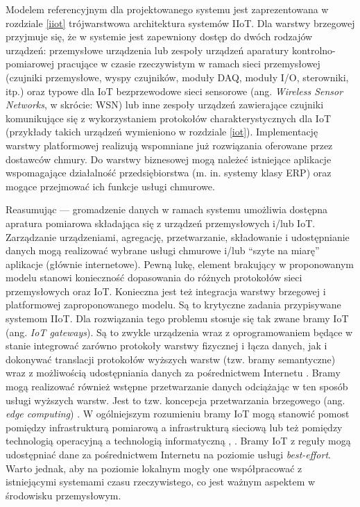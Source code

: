 \documentclass[a4paper, 12pt, twoside]{article}
\begin{document}
Modelem referencyjnym dla projektowanego systemu jest zaprezentowana w rozdziale
\ref{iiot} trójwarstwowa architektura systemów IIoT. Dla warstwy brzegowej przyjmuje 
się, że w systemie jest zapewniony dostęp do dwóch rodzajów urządzeń: przemysłowe urządzenia
lub zespoły urządzeń aparatury kontrolno-pomiarowej pracujące w czasie rzeczywistym 
w ramach sieci przemysłowej
(czujniki przemysłowe, wyspy czujników, moduły DAQ, moduły I/O, sterowniki, itp.)
oraz typowe dla IoT bezprzewodowe sieci sensorowe (ang. \emph{Wireless Sensor Networks}, w skrócie: WSN)
lub inne zespoły urządzeń zawierające czujniki komunikujące się z wykorzystaniem protokołów charakterystycznych dla IoT
\cite{iiot-gateway-introduction}
(przykłady takich urządzeń wymieniono w rozdziale \ref{iot}). Implementację warstwy
platformowej realizują wspomniane już rozwiązania oferowane przez dostawców chmury.
Do warstwy biznesowej mogą należeć istniejące aplikacje 
wspomagające działalność przedsiębiorstwa 
(m. in. systemy klasy ERP) oraz mogące przejmować ich funkcje usługi chmurowe. 

Reasumując --- gromadzenie danych w ramach systemu umożliwia dostępna apratura pomiarowa
składająca się z urządzeń przemysłowych i/lub IoT. Zarządzanie urządzeniami, agregację, przetwarzanie, składowanie i udostępnianie
danych mogą realizować wybrane usługi chmurowe i/lub ``szyte na miarę'' aplikacje (głównie internetowe).
Pewną lukę, element brakujący w proponowanym modelu stanowi konieczność dopasowania
do różnych protokołów sieci przemysłowych oraz IoT. Konieczna jest też integracja
warstwy brzegowej i platformowej zaproponowanego modelu. Są to krytyczne zadania
przypisywane systemom IIoT. Dla rozwiązania 
tego problemu stosuje się tak zwane bramy IoT (ang. \emph{IoT gateways}). Są to zwykle
urządzenia wraz z oprogramowaniem będące w stanie integrować zarówno protokoły
warstwy fizycznej i łącza danych, jak i dokonywać translacji protokołów wyższych warstw 
(tzw. bramy semantyczne) wraz z możliwością udostępniania danych za pośrednictwem
Internetu \cite{iiot-heterogenous-gateways}. Bramy mogą realizować również
wstępne przetwarzanie danych odciążając w ten sposób usługi wyższych warstw.
Jest to tzw. koncepcja przetwarzania brzegowego (ang. \emph{edge computing}) \cite{iot-gateway-medical-and-industrial}.
W ogólniejszym rozumieniu bramy IoT mogą stanowić pomost pomiędzy infrastrukturą
pomiarową a infrastrukturą sieciową lub też pomiędzy technologią operacyjną a 
technologią informatyczną \cite{iiot-gateway-introduction}, \cite{iiot-challenges-opportunities-directions}. 
Bramy IoT z reguły
mogą udostępniać dane za pośrednictwem Internetu na poziomie usługi \emph{best-effort}.
Warto jednak, aby na poziomie lokalnym mogły one współpracować z istniejącymi
systemami czasu rzeczywistego, co jest ważnym aspektem w środowisku przemysłowym. 
\end{document}
